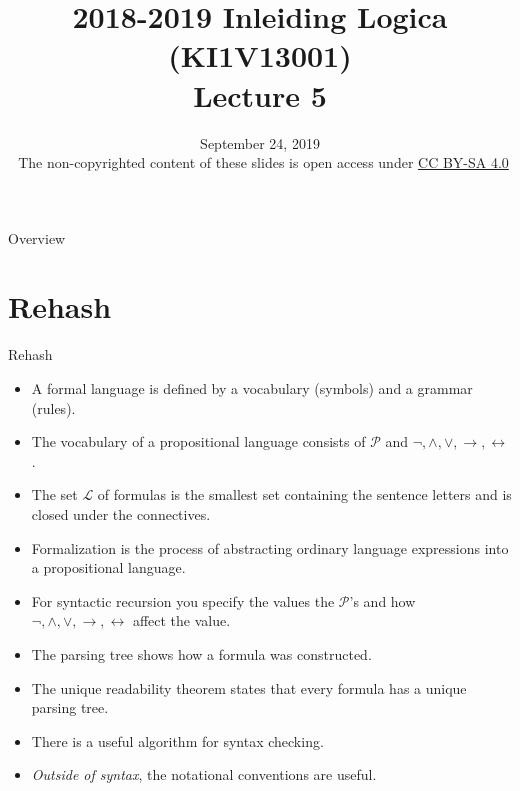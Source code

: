 \documentclass[../slides.tex]{subfiles}
\title{2018-2019 Inleiding Logica (KI1V13001) \\ Lecture 5}
\date{September 24, 2019\\[2ex] {\tiny \textcopyright~The non-copyrighted content of these slides is open access under \href{https://creativecommons.org/licenses/by-sa/4.0/}{CC BY-SA 4.0}}}
\begin{document}
\setcounter{framenumber}{128}
\begin{frame}
	\maketitle
\end{frame}

\begin{frame}{Overview}
\tableofcontents
\end{frame}

\section{Rehash}
\begin{frame}{Rehash}
	
 \begin{itemize}

	\item A formal language is defined by a vocabulary (symbols) and a grammar (rules).
	
	\item The vocabulary of a propositional language consists of $\mathcal{P}$ and $\neg,\land,\lor,\to,\leftrightarrow$.
	
	\item \alert{The set $\mathcal{L}$ of formulas is the smallest set containing the sentence letters and is closed under the connectives.} 
	
	\item Formalization is the process of abstracting ordinary language expressions into a propositional language.
	
	\item \alert{For syntactic recursion you specify the values the $\mathcal{P}$'s and how $\neg,\land,\lor,\to,\leftrightarrow$ affect the value.}
	
	\item \alert{The parsing tree shows how a formula was constructed.}
	
	\item The unique readability theorem states that every formula has a unique parsing tree.
	
	\item There is a useful algorithm for syntax checking.
	
	\item \alert{\emph{Outside of syntax}, the notational conventions are useful.}

\end{itemize}
	\end{frame}
		
\end{document}
